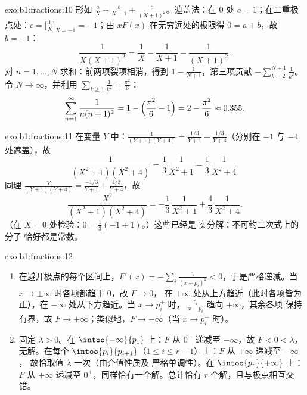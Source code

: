 \begin{solution}{exo:b1:fractions:10}
形如 $\frac aX + \frac b{X+1} + \frac c{(X+1)^2}$。遮盖法：在
$0$ 处 $a = 1$；在二重极点处：$c = \bigl[\frac1X
\bigr]_{X=-1} = -1$；由 $xF(x)$ 在无穷远处的极限得 $0 = a + b$，故
$b = -1$：
\[
\frac{1}{X(X+1)^2} = \frac1X - \frac1{X+1} - \frac1{(X+1)^2} .
\]
对 $n = 1, \dots, N$ 求和：前两项裂项相消，得到
$1 - \frac1{N+1}$，第三项贡献 $-\sum_{k=2}^{N+1}
\frac1{k^2}$。令 $N \to \infty$，并利用 $\sum_{k\geq1}
\frac1{k^2} = \frac{\pi^2}6$：
\[
\sum_{n=1}^{\infty}\frac{1}{n(n+1)^2}
= 1 - \Bigl(\frac{\pi^2}6 - 1\Bigr) = 2 - \frac{\pi^2}6
\approx 0.355 .
\]
\end{solution}

\begin{solution}{exo:b1:fractions:11}
在变量 $Y$ 中：$\frac1{(Y+1)(Y+4)} = \frac{1/3}{Y+1} -
\frac{1/3}{Y+4}$（分别在 $-1$ 与 $-4$ 处遮盖），故
\[
\frac{1}{(X^2+1)(X^2+4)}
= \frac13\,\frac1{X^2+1} - \frac13\,\frac1{X^2+4} .
\]
同理 $\frac{Y}{(Y+1)(Y+4)} = \frac{-1/3}{Y+1} +
\frac{4/3}{Y+4}$，故
\[
\frac{X^2}{(X^2+1)(X^2+4)}
= -\frac13\,\frac1{X^2+1} + \frac43\,\frac1{X^2+4} .
\]
（在 $X = 0$ 处检验：$0 = \frac13(-1 + 1)$。）这些已经是
实分解：不可约二次式上的分子
恰好都是常数。
\end{solution}

\begin{solution}{exo:b1:fractions:12}
\begin{enumerate}
  \item 在避开极点的每个区间上，$F'(x) = -\sum_i
        \frac{c_i}{(x - p_i)^2} < 0$，于是严格递减。当 $x
        \to \pm\infty$ 时各项都趋于 $0$，故 $F \to 0$，
        在 $+\infty$ 处从上方趋近（此时各项皆为正），在
        $-\infty$ 处从下方趋近。当 $x \to p_i^+$ 时，
        $\frac{c_i}{x - p_i}$ 趋向 $+\infty$，其余各项
        保持有界，故 $F \to +\infty$；类似地，$F \to -\infty$（当
        $x \to p_i^-$ 时）。
  \item 固定 $\lambda > 0$。在 $\intoo{-\infty}{p_1}$ 上：$F$
        从 $0^-$ 递减至 $-\infty$，故 $F < 0 < \lambda$，
        无解。在每个 $\intoo{p_i}{p_{i+1}}$（$1 \leq i
        \leq r-1$）上：$F$ 从 $+\infty$ 递减至 $-\infty$，
        故恰取值 $\lambda$ 一次（由介值性质及
        严格单调性）。在
        $\intoo{p_r}{+\infty}$ 上：$F$ 从 $+\infty$ 递减至
        $0^+$，同样恰有一个解。总计恰有 $r$
        个解，且与极点相互交错。
\end{enumerate}
\end{solution}

